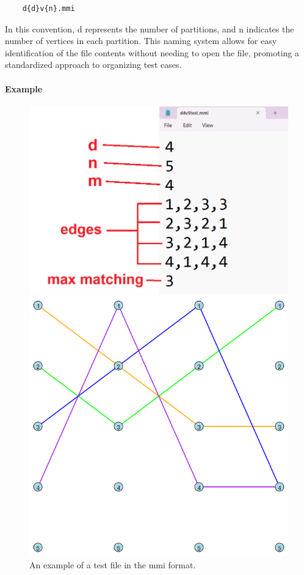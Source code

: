 \begin{verbatim}
    d{d}v{n}.mmi
\end{verbatim}

In this convention, d represents the number of partitions, and n indicates the number of vertices in each partition. This naming system allows for easy identification of the file contents without needing to open the file, promoting a standardized approach to organizing test cases.

\paragraph{Example}
\begin{figure}[h!]
    \centering
    \begin{minipage}{0.45\textwidth}
        \centering
        \includegraphics[width=\textwidth]{images/MMB_Solvers_Testing.png}
        \caption{An example of a test file in the mmi format.}
        \label{fig:image1}
    \end{minipage}
    \hfill
    \begin{minipage}{0.45\textwidth}
        \centering
        \includegraphics[width=\textwidth]{images/MMB_Solvers_Test.png}

\end{minipage}
\end{figure}
